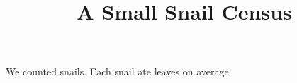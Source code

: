 \documentclass{article}
\title{A Small Snail Census}
\author{}
\date{}
\begin{document}
\maketitle
We counted \SnailCount{} snails. Each snail ate \MeanLeaves{} leaves on average.
\end{document}
